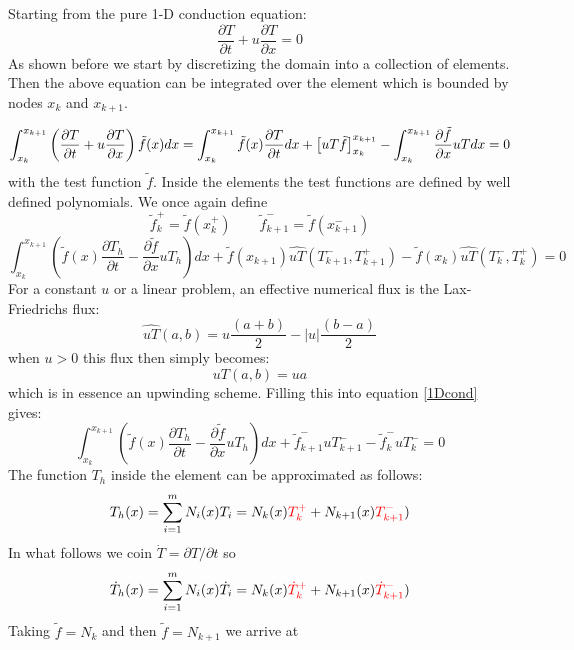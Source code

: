 Starting from the pure 1-D conduction equation:
\begin{equation}
    \frac{\partial T}{\partial t}+u\frac{\partial T}{\partial x}=0 
\end{equation}
As shown before we start by discretizing the domain into a collection of elements. Then the above equation can be integrated over the element which is bounded by nodes $x_k$ and $x_{k+1}$. 

\begin{equation}
\int_{x_k}^{x_{k+1}}  \left(\frac{\partial T}{\partial t}+u\frac{\partial T}{\partial x}\right) \tilde{f}(x) dx 
=
\int_{x_k}^{x_{k+1}} \tilde{f}(x)\frac{\partial T}{\partial t} dx
+\left[ uT \tilde{f}  \right]_{x_k}^{x_{k+1}}
-\int_{x_k}^{x_{k+1}} \frac{\partial \tilde{f}}{\partial x} uT dx
=0 \nonumber
\end{equation}
with the test function $\tilde{f}$. 
Inside the elements the test functions are defined by well defined polynomials. 
We once again define
\[
\tilde{f}_k^+=\tilde{f}(x_k^+)
\qquad
\tilde{f}_{k+1}^-=\tilde{f}(x_{k+1}^-)
\]
\begin{equation}
    \int_{x_k}^{x_{k+1}}\left(
    \tilde{f}(x)\frac{\partial T_h}{\partial t}-
    \frac{\partial \tilde{f}}{\partial x} uT_h \right) dx
    +\tilde{f}(x_{k+1})\widehat{uT}(T_{k+1}^-,T_{k+1}^+)
    -\tilde{f}(x_{k})\widehat{uT}(T_{k}^-,T_{k}^+)=0
    \label{1Dcond}
\end{equation}
For a constant $u$ or a linear problem, an effective numerical flux
is the Lax-Friedrichs flux:
\begin{equation}
\widehat{uT}(a,b)=u \frac{(a+b)}{2}-|u|\frac{(b-a)}{2}
\end{equation}
when $u>0$ this flux then simply becomes:
\begin{equation}
uT(a,b)=u a
\end{equation}
which is in essence an upwinding scheme.
Filling this into equation \ref{1Dcond} gives:
\begin{equation}
\int_{x_k}^{x_{k+1}}\left(
\tilde{f}(x)\frac{\partial T_h}{\partial t}-
\frac{\partial \tilde{f}}{\partial x} uT_h \right) dx
+\tilde{f}_{k+1}^-uT_{k+1}^-     -\tilde{f}_{k}^-uT_{k}^-=0
\end{equation}
The function $T_h$ inside the element can be approximated 
as follows:
\begin{equation}
T_h(x) = \sum_{i=1}^m N_i(x) T_i = 
N_k(x) {\color{red}T_k^+} + N_{k+1}(x) {\color{red}T_{k+1}^-}
\label{eq:dgadv1}) 
\end{equation}
In what follows we coin $\dot{T}=\partial T/\partial t$ so
\begin{equation}
\dot{T}_h(x) 
= \sum_{i=1}^m N_i(x) \dot{T}_i 
= N_k(x) {\color{red}\dot{T}_k^+} + N_{k+1}(x) {\color{red}\dot{T}_{k+1}^-}
\label{eq:dgadv2}) 
\end{equation}
Taking $\tilde{f}=N_k$ and then $\tilde{f}=N_{k+1}$ we arrive at

